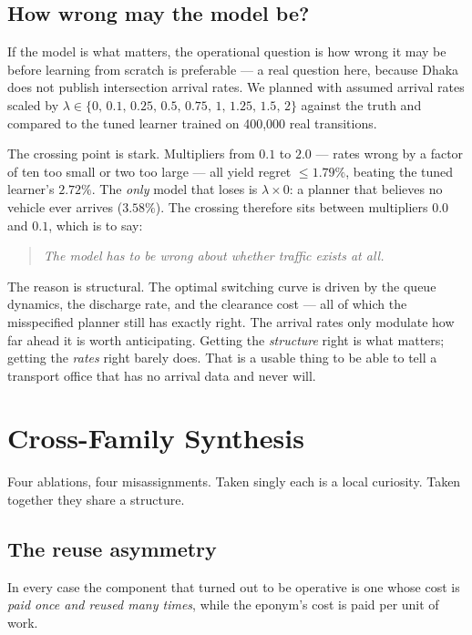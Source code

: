 \documentclass[11pt]{article}
\begin{document}
\subsection{How wrong may the model be?}

If the model is what matters, the operational question is how wrong it may be before learning from
scratch is preferable --- a real question here, because Dhaka does not publish intersection arrival
rates. We planned with assumed arrival rates scaled by
$\lambda \in \{0,\, 0.1,\, 0.25,\, 0.5,\, 0.75,\, 1,\, 1.25,\, 1.5,\, 2\}$ against
the truth and compared to the tuned learner trained on 400,000 real transitions.

The crossing point is stark. Multipliers from $0.1$ to $2.0$ --- rates wrong by a factor of ten too
small or two too large --- all yield regret $\leq 1.79\%$, beating the tuned learner's $2.72\%$. The
\emph{only} model that loses is $\lambda \times 0$: a planner that believes no vehicle ever arrives
($3.58\%$). The crossing therefore sits between multipliers $0.0$ and $0.1$, which is to say:

\begin{quote}
\itshape The model has to be wrong about whether traffic exists at all.
\end{quote}

The reason is structural. The optimal switching curve is driven by the queue dynamics, the discharge
rate, and the clearance cost --- all of which the misspecified planner still has exactly right. The
arrival rates only modulate how far ahead it is worth anticipating. Getting the \emph{structure}
right is what matters; getting the \emph{rates} right barely does. That is a usable thing to be able
to tell a transport office that has no arrival data and never will.

\section{Cross-Family Synthesis}
\label{sec:synthesis}

Four ablations, four misassignments. Taken singly each is a local curiosity. Taken together they
share a structure.

\subsection{The reuse asymmetry}

In every case the component that turned out to be operative is one whose cost is \emph{paid once
and reused many times}, while the eponym's cost is paid per unit of work.
\end{document}
